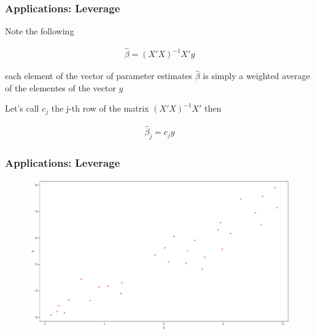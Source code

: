\documentclass[
  shownotes,
  xcolor={svgnames},
  hyperref={colorlinks,citecolor=DarkBlue,linkcolor=DarkRed,urlcolor=DarkBlue}
  , aspectratio=169]{beamer}
\begin{document}
\begin{frame}
\frametitle{Applications: Leverage}
Note the following 

\begin{align}
\hat \beta=(X'X)^{-1}X'y
\end{align}

each element of the vector of parameter estimates $\hat \beta$ is simply a weighted average of the elementes of the vector $y$

Let's call $c_j$ the {j-th} row of the matrix $(X'X)^{-1}X'$ then

\begin{align}
\hat \beta_j=c_j y
\end{align}


\end{frame}
\begin{frame}
\frametitle{Applications: Leverage}

\begin{figure}[H] \centering
  \centering
  \includegraphics[scale=0.35]{figures/fig_1.pdf}
  \\
  \tiny
\end{figure}

\end{frame}
\end{document}
